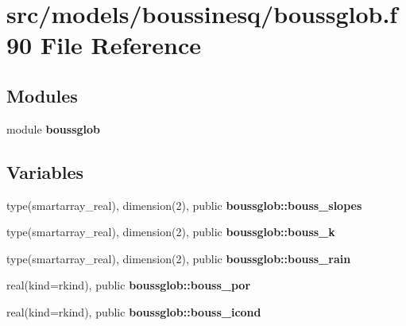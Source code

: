 \section{src/models/boussinesq/boussglob.f90 File Reference}
\label{boussglob_8f90}
\subsection*{Modules}
\begin{DoxyCompactItemize}
\item 
module {\bf boussglob}
\end{DoxyCompactItemize}
\subsection*{Variables}
\begin{DoxyCompactItemize}
\item 
type(smartarray\+\_\+real), dimension(2), public {\bf boussglob\+::bouss\+\_\+slopes}
\item 
type(smartarray\+\_\+real), dimension(2), public {\bf boussglob\+::bouss\+\_\+k}
\item 
type(smartarray\+\_\+real), dimension(2), public {\bf boussglob\+::bouss\+\_\+rain}
\item 
real(kind=rkind), public {\bf boussglob\+::bouss\+\_\+por}
\item 
real(kind=rkind), public {\bf boussglob\+::bouss\+\_\+icond}
\end{DoxyCompactItemize}

